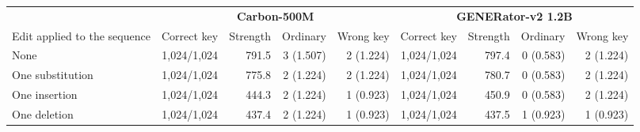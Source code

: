 \begin{tabular}{@{}l rrrr@{\hspace{10pt}}rrrr@{}}
\toprule
& \multicolumn{4}{c}{\textbf{Carbon-500M}} & \multicolumn{4}{c}{\textbf{GENERator-v2 1.2B}} \\
\cmidrule(lr){2-5}\cmidrule(l){6-9}
Edit applied to the sequence & Correct key & Strength & Ordinary & Wrong key & Correct key & Strength & Ordinary & Wrong key \\
\midrule
None & 1{,}024/1{,}024 & 791.5 & 3 (1.507) & 2 (1.224) & 1{,}024/1{,}024 & 797.4 & 0 (0.583) & 2 (1.224) \\
One substitution & 1{,}024/1{,}024 & 775.8 & 2 (1.224) & 2 (1.224) & 1{,}024/1{,}024 & 780.7 & 0 (0.583) & 2 (1.224) \\
One insertion & 1{,}024/1{,}024 & 444.3 & 2 (1.224) & 1 (0.923) & 1{,}024/1{,}024 & 450.9 & 0 (0.583) & 2 (1.224) \\
One deletion & 1{,}024/1{,}024 & 437.4 & 2 (1.224) & 1 (0.923) & 1{,}024/1{,}024 & 437.5 & 1 (0.923) & 1 (0.923) \\
\bottomrule
\end{tabular}
